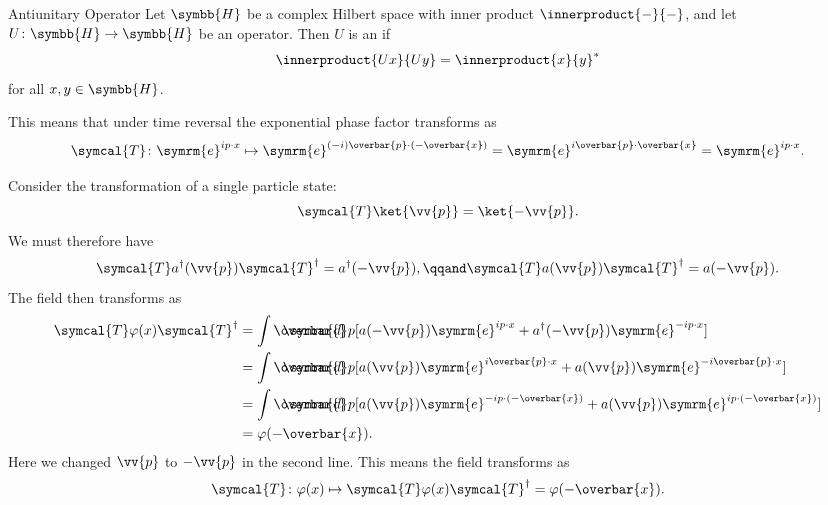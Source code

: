 \documentclass[fleqn]{NotesClass}
\newcommand{\e}{\symrm{e}}
\newcommand{\timeReversal}{\symcal{T}}
\newcommand{\hermit}{{\dagger}}
\newcommand{\dbar}[1][0.0]{\ThisStyle{\ensurestackMath{%
            \stackengine{#1\LMex}{\SavedStyle \symrm{d}}{\SavedStyle\overbar{}%
                \mkern2.25mu}{O}{r}{F}{F}{L}}}}
\newcommand{\invariantmeasure}[1]{%
    \mathchoice{\dbar #1}{\dbar #1}{\dbar[.05] #1}{\dbar[.06] #1}
}
\newcommand{\hilbertSpace}{\symbb{H}}
\begin{document}
    \begin{dfn}{Antiunitary Operator}{}
        Let \(\hilbertSpace\) be a complex Hilbert space with inner product \(\innerproduct{-}{-}\), and let \(U \colon \hilbertSpace \to \hilbertSpace\) be an operator.
        Then \(U\) is an  if
        \begin{equation}
            \innerproduct{Ux}{Uy} = \innerproduct{x}{y}^*
        \end{equation}
        for all \(x, y \in \hilbertSpace\).
    \end{dfn}
    
    This means that under time reversal the exponential phase factor transforms as
    \begin{equation}
        \timeReversal \colon \e^{ip\cdot x} \mapsto \e^{(-i)\overbar{p} \cdot (-\overbar{x})} = \e^{i\overbar{p}\cdot\overbar{x}} = \e^{ip \cdot x}.
    \end{equation}
    
    Consider the transformation of a single particle state:
    \begin{equation}
        \timeReversal\ket{\vv{p}} = \ket{-\vv{p}}.
    \end{equation}
    We must therefore have
    \begin{equation}
        \timeReversal a^\hermit(\vv{p}) \timeReversal^\hermit = a^\hermit(-\vv{p}), \qqand \timeReversal a(\vv{p}) \timeReversal^\hermit = a(-\vv{p}).
    \end{equation}
    The field then transforms as
    \begin{align}
        \timeReversal \varphi(x) \timeReversal^\hermit &= \int \invariantmeasure{p} [a(-\vv{p}) \e^{ip\cdot x} + a^\hermit(-\vv{p}) \e^{-ip\cdot x}]\\
        &= \int \invariantmeasure{p} [a(\vv{p}) \e^{i\overbar{p} \cdot x} + a(\vv{p})\e^{-i\overbar{p}\cdot x}]\\
        &= \int \invariantmeasure{p} [a(\vv{p}) \e^{-ip\cdot (-\overbar{x})} + a(\vv{p})\e^{ip \cdot (-\overbar{x})}]\\
        &= \varphi(-\overbar{x}).
    \end{align}
    Here we changed \(\vv{p}\) to \(-\vv{p}\) in the second line.
    This means the field transforms as
    \begin{equation}
        \timeReversal \colon \varphi(x) \mapsto \timeReversal \varphi(x) \timeReversal^\hermit = \varphi(-\overbar{x}).
    \end{equation}
    
\end{document}
